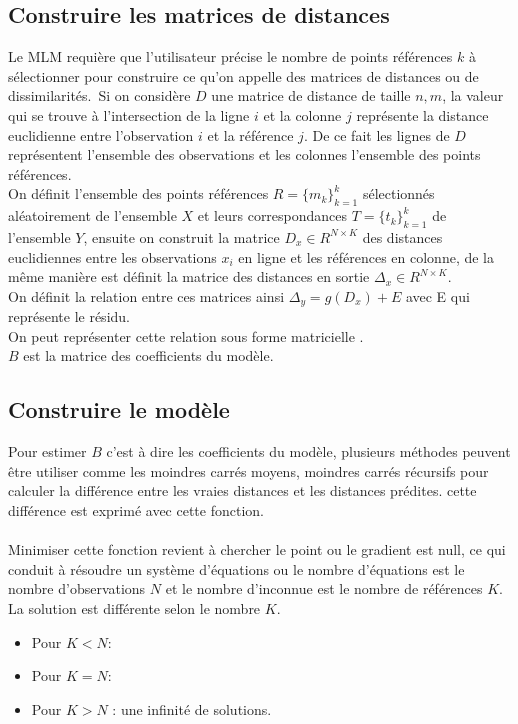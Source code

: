\documentclass[12pt,a4paper]{report}
\begin{document}
{\color{MidnightBlue}\subsection{Construire les matrices de distances}}
\par Le MLM requière que l'utilisateur précise le nombre de points références $k$ à sélectionner pour construire ce qu'on appelle des matrices de distances ou de dissimilarités.\
Si on considère $D$ une matrice de distance de taille $n,m$, la valeur qui se trouve à l'intersection de la ligne $i$ et la colonne $j$ représente la distance euclidienne entre l'observation $i$ et la référence $j$. De ce fait les lignes de $D$ représentent l'ensemble des observations et les colonnes l'ensemble des points références.\\
On définit l'ensemble des points références $R=\{m_k\}_{k=1}^k$ sélectionnés aléatoirement de l'ensemble $X$ et leurs correspondances $T =\{t_k\}_{k=1}^k$ de l'ensemble $Y$, ensuite on construit la matrice $D_x \in R^{N \times K}$ des distances euclidiennes entre les observations $x_i$ en ligne et les références  en colonne, de la même manière est définit la matrice des distances en sortie $\Delta_x \in R^{N \times K}$.\\
On définit la relation entre ces matrices ainsi $\Delta_y = g(D_x) + E$ avec E qui représente le résidu.\\
On peut représenter cette relation sous forme matricielle \boldmath{$\Delta_y = D_xB + E$}.\\$B$ est la matrice des coefficients du modèle.\\

{\color{MidnightBlue}\subsection{Construire le modèle}}
\par Pour estimer $B$ c'est à dire les coefficients du modèle, plusieurs méthodes peuvent être utiliser comme les moindres carrés moyens, moindres carrés récursifs pour calculer la différence entre les vraies distances et les distances prédites. cette différence est exprimé avec cette fonction.\\ \\
Minimiser cette fonction revient à chercher le point ou le gradient est null, ce qui conduit à résoudre un système d'équations ou le nombre d'équations est le nombre d'observations $N$ et le nombre d'inconnue est le nombre de références $K$. La solution est différente selon le nombre $K$.\\
\begin{itemize}
\item Pour $K < N$: 
\item Pour $K = N$: \boldmath{$\hat{B} = {D_x}^{-1} \Delta_y$}
\item Pour $K > N$ : une infinité de solutions.
\end{itemize}
\end{document}

